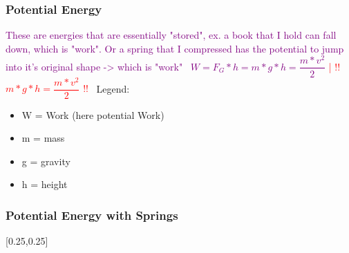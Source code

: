 \documentclass[main.tex,fontsize=8pt,paper=a4,paper=portrait,DIV=calc,]{scrartcl}
\begin{document}
\begin{multicols*}{2}
\subsubsection{Potential Energy}
\textcolor{purple}{These are energies that are essentially "stored", ex. a book that I hold can fall down, which is "work".\newline
Or a spring that I compressed has the potential to jump into it's original shape -> which is "work"}\newline
\, \newline
\large \textcolor{purple}{\( W = F_G * h =  m * g * h = \dfrac{m*v^2}{2} \)}
\large \textcolor{red}{| !! \(m * g * h = \dfrac{m*v^2}{2} \) !!}\newline
\, \newline
\normalsize Legend: \newline
\begin{itemize}
\item W = Work (here potential Work)
\item m = mass
\item g = gravity 
\item h = height
\end{itemize}

\subsubsection{Potential Energy with Springs}
[0.25,0.25]


\end{multicols*}
\end{document}
